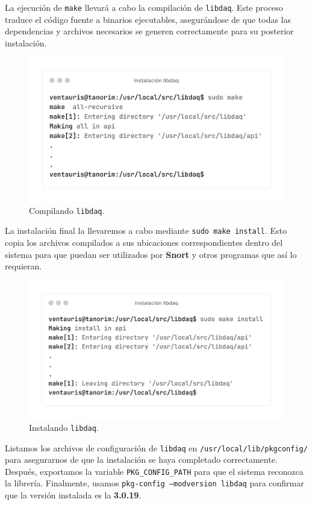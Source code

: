 \documentclass[11pt,a4paper,twoside]{report}
\begin{document}
La ejecución de \texttt{make} llevará a cabo la compilación de \texttt{libdaq}. Este proceso traduce el código fuente a binarios ejecutables, asegurándose de que todas las dependencias y archivos necesarios se generen correctamente para su posterior instalación.

\begin{figure}[H]
	\centering
	\includegraphics[scale=0.12]{instalacion_snort/12-12.png}
	\caption{Compilando \texttt{libdaq}.}
\end{figure}

\newpage

La instalación final la llevaremos a cabo mediante \texttt{sudo make install}. Esto copia los archivos compilados a sus ubicaciones correspondientes dentro del sistema para que puedan ser utilizados por \textbf{Snort} y otros programas que así lo requieran.

\begin{figure}[H]
	\centering
	\includegraphics[scale=0.12]{instalacion_snort/13-13.png}
	\caption{Instalando \texttt{libdaq}.}
\end{figure}

Listamos los archivos de configuración de \texttt{libdaq} en \texttt{/usr/local/lib/pkgconfig/} para asegurarnos de que la instalación se haya completado correctamente. Después, exportamos la variable \texttt{PKG\_CONFIG\_PATH} para que el sistema reconozca la librería. Finalmente, usamos \texttt{pkg-config --modversion libdaq} para confirmar que la versión instalada es la \textbf{3.0.19}.
\end{document}
